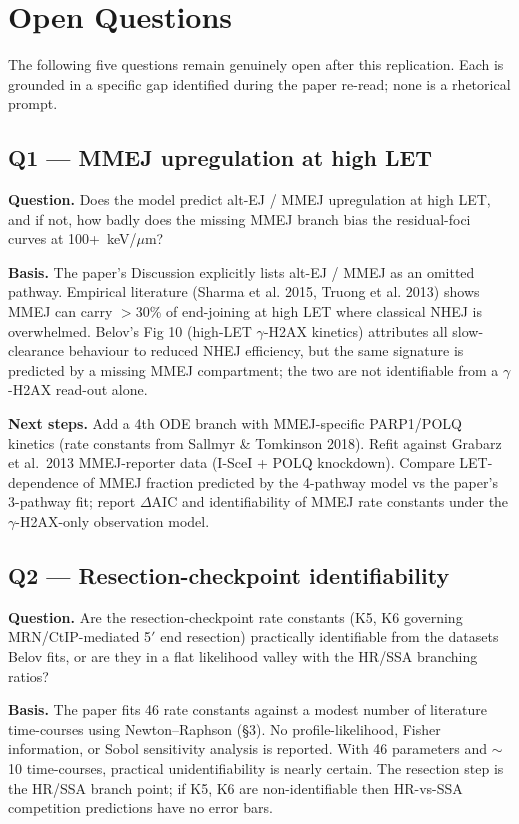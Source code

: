 \section*{Open Questions}

The following five questions remain genuinely open after this replication.
Each is grounded in a specific gap identified during the paper re-read; none
is a rhetorical prompt.

\subsection*{Q1 --- MMEJ upregulation at high LET}

\textbf{Question.} Does the model predict alt-EJ / MMEJ upregulation at high LET,
and if not, how badly does the missing MMEJ branch bias the residual-foci
curves at 100+~keV/$\mu$m?

\textbf{Basis.} The paper's Discussion explicitly lists alt-EJ / MMEJ as an
omitted pathway. Empirical literature (Sharma et al. 2015, Truong et al. 2013)
shows MMEJ can carry $>$30\% of end-joining at high LET where classical NHEJ
is overwhelmed. Belov's Fig 10 (high-LET $\gamma$-H2AX kinetics) attributes all
slow-clearance behaviour to reduced NHEJ efficiency, but the same signature is
predicted by a missing MMEJ compartment; the two are not identifiable from a
$\gamma$-H2AX read-out alone.

\textbf{Next steps.} Add a 4th ODE branch with MMEJ-specific PARP1/POLQ kinetics
(rate constants from Sallmyr \& Tomkinson 2018). Refit against Grabarz et al.\
2013 MMEJ-reporter data (I-SceI + POLQ knockdown). Compare LET-dependence of
MMEJ fraction predicted by the 4-pathway model vs the paper's 3-pathway fit;
report $\Delta$AIC and identifiability of MMEJ rate constants under the
$\gamma$-H2AX-only observation model.

\subsection*{Q2 --- Resection-checkpoint identifiability}

\textbf{Question.} Are the resection-checkpoint rate constants (K5, K6 governing
MRN/CtIP-mediated 5$'$ end resection) practically identifiable from the datasets
Belov fits, or are they in a flat likelihood valley with the HR/SSA branching
ratios?

\textbf{Basis.} The paper fits 46 rate constants against a modest number of
literature time-courses using Newton--Raphson (\S3). No profile-likelihood,
Fisher information, or Sobol sensitivity analysis is reported. With 46
parameters and $\sim$10 time-courses, practical unidentifiability is nearly
certain. The resection step is the HR/SSA branch point; if K5, K6 are
non-identifiable then HR-vs-SSA competition predictions have no error bars.

